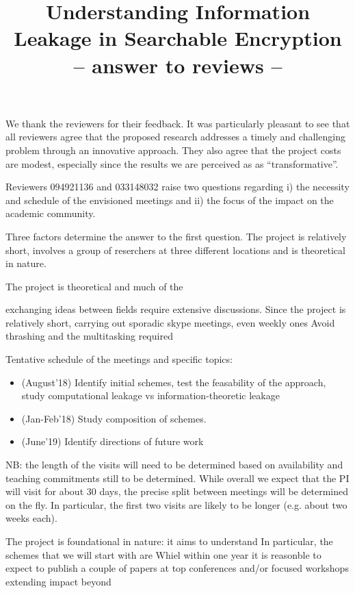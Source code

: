 \documentclass[11pt]{scrartcl}
\date{}
\title{Understanding Information Leakage in Searchable Encryption \\
-- answer to reviews --}
\begin{document}
\maketitle


We thank the reviewers for their feedback. It was particularly pleasant to see that all reviewers agree that the proposed research addresses a timely and challenging problem through an innovative approach.
They also agree that the project costs are modest, especially since the results we are perceived as as ``transformative''. 

\vspace{.2cm}
Reviewers 094921136 and 033148032 raise two questions regarding i) the necessity and schedule of the envisioned meetings and ii) the focus of the impact on the academic community.


Three factors determine the answer to the first question.  The project is relatively short, involves a group of reserchers at three different locations and is theoretical in nature.

The project is theoretical and much of the

exchanging ideas between fields require extensive discussions.
Since the project is relatively short, carrying out sporadic skype meetings, even weekly ones
Avoid thrashing and the multitasking required 

Tentative schedule of the meetings and specific topics:
\begin{itemize}\itemsep-3pt
  \item (August'18) Identify initial schemes, test the feasability of the approach, study computational leakage vs information-theoretic leakage 
\item (Jan-Feb'18) Study composition of schemes. 
\item (June'19) Identify directions of future work 
\end{itemize}

NB: the length of the visits will need to be determined based on availability and teaching commitments still to be determined. While overall we expect that the PI will visit for about 30 days, the precise split between meetings will be determined on the fly. In particular, the first two visits are likely to be longer (e.g. about two weeks each).

The project is foundational in nature: it aims to understand
In particular, the schemes that we will start with are
Whiel within one year it is reasonble to expect to publish a couple of papers at top conferences and/or focused workshops extending impact beyond 
\end{document}
